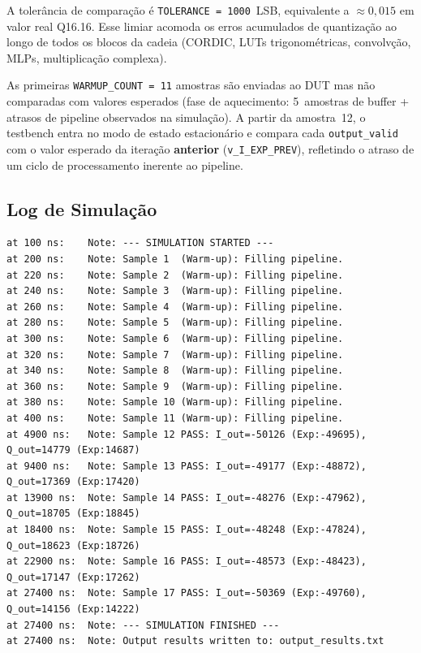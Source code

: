 \documentclass[a4paper,12pt]{article}
\begin{document}
A toler\^ancia de compara\c{c}\~ao \'e \texttt{TOLERANCE = 1000}~LSB, equivalente a $\approx 0{,}015$ em valor real Q16.16. Esse limiar acomoda os erros acumulados de quantiza\c{c}\~ao ao longo de todos os blocos da cadeia (CORDIC, LUTs trigonom\'etricas, convolv\c{c}\~ao, MLPs, multiplica\c{c}\~ao complexa).

As primeiras \texttt{WARMUP\_COUNT = 11} amostras s\~ao enviadas ao DUT mas n\~ao comparadas com valores esperados (fase de aquecimento: 5~amostras de buffer + atrasos de pipeline observados na simula\c{c}\~ao). A partir da amostra~12, o testbench entra no modo de estado estacion\'ario e compara cada \texttt{output\_valid} com o valor esperado da itera\c{c}\~ao \textbf{anterior} (\texttt{v\_I\_EXP\_PREV}), refletindo o atraso de um ciclo de processamento inerente ao pipeline.

\subsection{Log de Simula\c{c}\~ao}

\begin{lstlisting}[style=logstyle,
    caption={Log do ISim -- valida\c{c}\~ao \textit{end-to-end} do \texttt{NeuralNet\_Complete}.},
    label={lst:log_top}]
at 100 ns:    Note: --- SIMULATION STARTED ---
at 200 ns:    Note: Sample 1  (Warm-up): Filling pipeline.
at 220 ns:    Note: Sample 2  (Warm-up): Filling pipeline.
at 240 ns:    Note: Sample 3  (Warm-up): Filling pipeline.
at 260 ns:    Note: Sample 4  (Warm-up): Filling pipeline.
at 280 ns:    Note: Sample 5  (Warm-up): Filling pipeline.
at 300 ns:    Note: Sample 6  (Warm-up): Filling pipeline.
at 320 ns:    Note: Sample 7  (Warm-up): Filling pipeline.
at 340 ns:    Note: Sample 8  (Warm-up): Filling pipeline.
at 360 ns:    Note: Sample 9  (Warm-up): Filling pipeline.
at 380 ns:    Note: Sample 10 (Warm-up): Filling pipeline.
at 400 ns:    Note: Sample 11 (Warm-up): Filling pipeline.
at 4900 ns:   Note: Sample 12 PASS: I_out=-50126 (Exp:-49695), Q_out=14779 (Exp:14687)
at 9400 ns:   Note: Sample 13 PASS: I_out=-49177 (Exp:-48872), Q_out=17369 (Exp:17420)
at 13900 ns:  Note: Sample 14 PASS: I_out=-48276 (Exp:-47962), Q_out=18705 (Exp:18845)
at 18400 ns:  Note: Sample 15 PASS: I_out=-48248 (Exp:-47824), Q_out=18623 (Exp:18726)
at 22900 ns:  Note: Sample 16 PASS: I_out=-48573 (Exp:-48423), Q_out=17147 (Exp:17262)
at 27400 ns:  Note: Sample 17 PASS: I_out=-50369 (Exp:-49760), Q_out=14156 (Exp:14222)
at 27400 ns:  Note: --- SIMULATION FINISHED ---
at 27400 ns:  Note: Output results written to: output_results.txt
\end{lstlisting}
\end{document}
